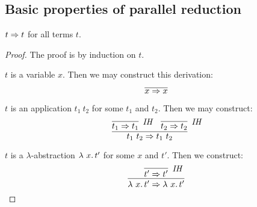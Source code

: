 \subsection{Basic properties of parallel reduction}

\begin{lemma}
  \label{lem:predrefl}
  $t \Rightarrow t$ for all terms $t$.
\end{lemma}
\begin{proof}
  The proof is by induction on $t$.

  \case{ } $t$ is a variable $x$. Then we may construct this derivation:
  \[
  \infer{x \Pred x}{\ }
  \]
  
\case{ } $t$ is an application $t_1\ t_2$ for some $t_1$ and $t_2$. Then we may construct:
\[
\infer{t_1\ t_2 \Pred t_1\ t_2}{\infer[\textit{IH}]{t_1 \Pred t_1}{\ } & \infer[\textit{IH}]{t_2 \Pred t_2}{\ }}
\]

\case{ } $t$ is a $\lambda$-abstraction $\lambda\ x.\, t'$ for some $x$ and $t'$. Then we construct:
\[
\infer{\lam{x}{t'} \Pred \lam{x}{t'}}{\infer[\textit{IH}]{t' \Pred t'}{\ }}
\]
\end{proof}

